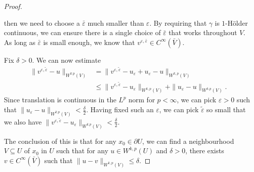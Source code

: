 \documentclass[a4paper]{article}
\begin{document}
\begin{proof}
\begin{center}
  \end{center}
  then we need to choose a $\bar{\varepsilon}$ much smaller than $\varepsilon$. By requiring that $\gamma$ is $1$-H\"older continuous, we can ensure there is a single choice of $\bar{\varepsilon}$ that works throughout $V$. As long as $\bar{\varepsilon}$ is small enough, we know that $v^{\varepsilon, \bar{\varepsilon}} \in C^\infty(\bar{V})$.

  Fix $\delta > 0$. We can now estimate
  \begin{align*}
    \|v^{\varepsilon, \tilde{\varepsilon}} - u\|_{W^{k. p}(V)} &= \|v^{\varepsilon, \tilde{\varepsilon}} - u_\varepsilon + u_\varepsilon - u\|_{W^{k, p}(V)}\\
    &\leq \|v^{\varepsilon, \tilde{\varepsilon}} - u_\varepsilon\|_{W^{k, p}(V)} + \|u_\varepsilon - u\|_{W^{k. p}(V)}.
  \end{align*}
  Since translation is continuous in the $L^p$ norm for $p < \infty$, we can pick $\varepsilon > 0$ such that $\|u_\varepsilon - u\|_{W^{k. p}(V)} < \frac{\delta}{2}$. Having fixed such an $\varepsilon$, we can pick $\tilde{\varepsilon}$ so small that we also have $\|v^{\varepsilon, \tilde{\varepsilon}} - u_\varepsilon\|_{W^{k. p}(V)} < \frac{\delta}{2}$.

  The conclusion of this is that for any $x_0 \in \partial U$, we can find a neighbourhood $V \subseteq U$ of $x_0$ in $U$ such that for any $u \in W^{k, p}(U)$ and $\delta > 0$, there exists $v \in C^\infty(\bar{V})$ such that $\|u - v\|_{W^{k, p}(V)} \leq \delta$.


\end{proof}
\end{document}
